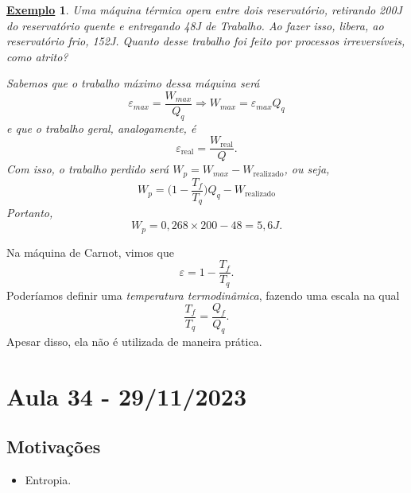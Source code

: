 \documentclass{article}
\newtheorem{example}{\underline{Exemplo}}
\begin{document}
\begin{example}
  Uma máquina térmica opera entre dois reservatório, retirando 200J do reservatório quente e entregando 48J de Trabalho. Ao fazer isso, libera, ao reservatório frio, 152J.
Quanto desse trabalho foi feito por processos irreversíveis, como atrito?

  Sabemos que o trabalho máximo dessa máquina será 
  \[
    \varepsilon_{max} = \frac{W_{max}}{Q_{q}} \Rightarrow W_{max} = \varepsilon_{max}Q_{q}
  \]
  e que o trabalho geral, analogamente, é 
  \[
    \varepsilon_{\text{real}}  = \frac{W_{\text{real}}}{Q}.
  \]
  Com isso, o trabalho perdido será \(W_{p} = W_{max} - W_{\text{realizado}}\), ou seja, 
  \[
    W_{p} = \biggl(1 - \frac{T_{f}}{T_{q}}\biggr)Q_{q} - W_{\text{realizado}}
  \]
  Portanto, 
  \[
    W_{p} = 0,268\times 200 - 48 = 5,6J.
  \]
\end{example}
  Na máquina de Carnot, vimos que 
  \[
    \varepsilon  = 1 - \frac{T_{f}}{T_{q}}.
  \]
  Poderíamos definir uma \textit{temperatura termodinâmica}, fazendo uma escala na qual 
  \[
    \frac{T_{f}}{T_{q}} = \frac{Q_{f}}{Q_{q}}.
  \]
  Apesar disso, ela não é utilizada de maneira prática.
\newpage

\section{Aula 34 - 29/11/2023}
\subsection{Motivações} 
\begin{itemize}
  \item Entropia.
\end{itemize}
\end{document}
